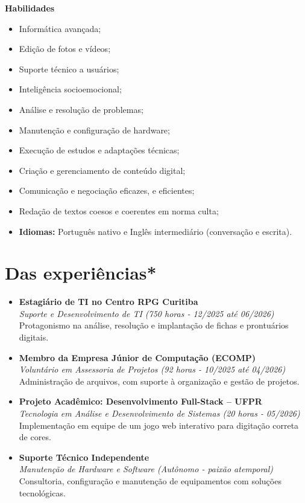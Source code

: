 \documentclass[a4paper,11pt]{article}
\begin{document}
\vspace{0.3cm}
\textbf{Habilidades}
\begin{itemize}[noitemsep, label={--}]
  \item Informática avançada;
\item Edição de fotos e vídeos;
\item Suporte técnico a usuários;
\item Inteligência socioemocional;
\item Análise e resolução de problemas;
\item Manutenção e configuração de hardware;
\item Execução de estudos e adaptações técnicas;
\item Criação e gerenciamento de conteúdo digital;
\item Comunicação e negociação eficazes, e eficientes;
\item Redação de textos coesos e coerentes em norma culta;
\item \textbf {Idiomas:} Português nativo e Inglês intermediário (conversação e escrita).
\end{itemize}

\section*{Das experiências*}
\begin{itemize}[noitemsep, label={$\bullet$}]
  \item \textbf{Estagiário de TI no Centro RPG Curitiba}\\
\textit{Suporte e Desenvolvimento de TI (750 horas - 12/2025 até 06/2026)}\\
Protagonismo na análise, resolução e implantação de fichas e prontuários digitais.
\vspace{0.2cm}

\item \textbf{Membro da Empresa Júnior de Computação (ECOMP)}\\
\textit{Voluntário em Assessoria de Projetos (92 horas - 10/2025 até 04/2026)}\\
Administração de arquivos, com suporte à organização e gestão de projetos.
\vspace{0.2cm}

\item \textbf{Projeto Acadêmico: Desenvolvimento Full-Stack -- UFPR}\\
\textit{Tecnologia em Análise e Desenvolvimento de Sistemas (20 horas - 05/2026)}\\
Implementação em equipe de um jogo web interativo para digitação correta de cores.
\vspace{0.2cm}

\item \textbf{Suporte Técnico Independente}\\
\textit{Manutenção de Hardware e Software (Autônomo - paixão atemporal)}\\
Consultoria, configuração e manutenção de equipamentos com soluções tecnológicas.
\end{itemize}
\end{document}
